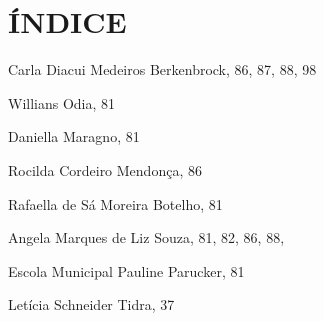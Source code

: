 




\chapter*{ÍNDICE}

{ \setlength{\parindent}{0pt}  %
	



Carla Diacui Medeiros Berkenbrock, 86, 87, 88, 98

Willians Odia, 81

Daniella Maragno, 81

Rocilda Cordeiro Mendonça, 86

Rafaella de Sá Moreira Botelho, 81

Angela Marques de Liz Souza, 81, 82, 86, 88, 

Escola Municipal Pauline Parucker, 81

Letícia Schneider Tidra, 37



	
	
	
	
} %


